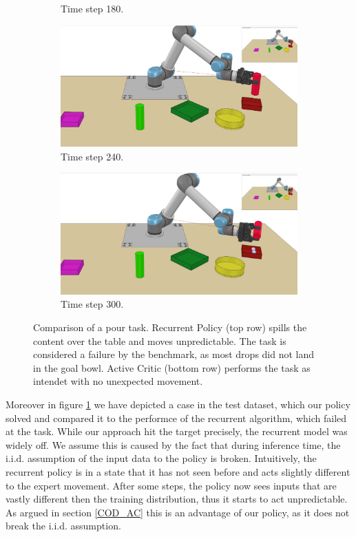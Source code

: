 \begin{figure}
\begin{subfigure}[t]{0.18\textwidth}
        \caption{Time step 180.}
    \end{subfigure}
    \begin{subfigure}[t]{0.18\textwidth}
        \includegraphics[width=\linewidth]{images/Language_Conditioned_Exp/mine_4.png}
        \caption{Time step 240.}
    \end{subfigure}
    \begin{subfigure}[t]{0.18\textwidth}
        \includegraphics[width=\linewidth]{images/Language_Conditioned_Exp/mine_5.png}
        \caption{Time step 300.}
    \end{subfigure}
    \caption{Comparison of a pour task. Recurrent Policy (top row) spills the content over the table and moves unpredictable. The task is considered a failure 
    by the benchmark, as most drops did not land in the goal bowl. Active Critic (bottom row) performs the task as intendet with no unexpected movement.}
    \label{fig: AC vs. Rec}
\end{figure}
Moreover in figure \ref{fig: AC vs. Rec} we have depicted a case in the test dataset, which our policy solved and compared it to the performce of the recurrent algorithm, which failed at the task. 
While our approach hit the target precisely, the recurrent model was widely off. We assume this is caused by the fact that during inference time, the 
i.i.d. assumption of the input data to the policy is broken. Intuitively, the recurrent policy 
is in a state that it has not seen before and acts slightly different to the expert movement. After some steps, the policy now sees inputs that are vastly 
different then the training distribution, thus it starts to act unpredictable. As argued in section \ref{COD_AC} this is an advantage of our policy, as it 
does not break the i.i.d. assumption.

